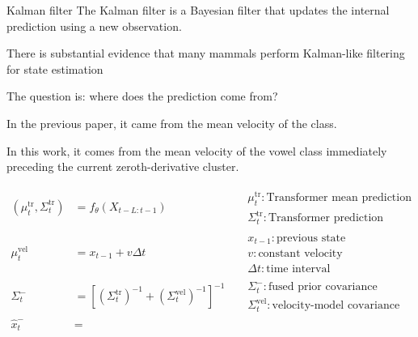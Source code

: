 \begin{frame}[allowframebreaks]{Kalman filter}
    The Kalman filter is a Bayesian filter that updates the internal prediction using a new observation.
    
    There is substantial evidence that many mammals perform Kalman-like filtering for state estimation \cite{wolpert-2007-probabilistic-models-in-human-sensorimotor-control}
    
    The question is: where does the prediction come from?
    
    In the previous paper, it came from the mean velocity of the class.
    
    In this work, it comes from the mean velocity of the vowel class immediately preceding the current zeroth-derivative cluster.
    
    \[
        \begin{aligned}
        (\mu^{\mathrm{tr}}_{t},\Sigma^{\mathrm{tr}}_{t})
            &=
            f_{\theta}(X_{t-L:t-1})
            &&
            \begin{array}{l}
                \mu^{\mathrm{tr}}_{t}: \text{Transformer mean prediction} \\
                \Sigma^{\mathrm{tr}}_{t}: \text{Transformer prediction covariance}
            \end{array}
            \\[8pt]
            \mu^{\mathrm{vel}}_{t}
            &=
            x_{t-1}
            +
            v\Delta t
            &&
            \begin{array}{l}
                x_{t-1}: \text{previous state} \\
                v: \text{constant velocity} \\
                \Delta t: \text{time interval}
            \end{array}
            \\[8pt]
            \Sigma^{-}_{t}
            &=
            \left[
                (\Sigma^{\mathrm{tr}}_{t})^{-1}
                +
                (\Sigma^{\mathrm{vel}}_{t})^{-1}
            \right]^{-1}
            &&
            \begin{array}{l}
                \Sigma^{-}_{t}: \text{fused prior covariance} \\
                \Sigma^{\mathrm{vel}}_{t}: \text{velocity-model covariance}
            \end{array}
            \\[8pt]
            \hat{x}^{-}_{t}
            &=

\end{aligned}\]
\end{frame}
